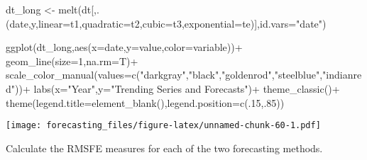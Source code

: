 \documentclass[
  oneside]{book}
\newenvironment{Shaded}{\begin{snugshade}}{\end{snugshade}}
\newcommand{\AttributeTok}[1]{\textcolor[rgb]{0.77,0.63,0.00}{#1}}
\newcommand{\DecValTok}[1]{\textcolor[rgb]{0.00,0.00,0.81}{#1}}
\newcommand{\FunctionTok}[1]{\textcolor[rgb]{0.00,0.00,0.00}{#1}}
\newcommand{\NormalTok}[1]{#1}
\newcommand{\OtherTok}[1]{\textcolor[rgb]{0.56,0.35,0.01}{#1}}
\newcommand{\SpecialCharTok}[1]{\textcolor[rgb]{0.00,0.00,0.00}{#1}}
\newcommand{\StringTok}[1]{\textcolor[rgb]{0.31,0.60,0.02}{#1}}
\begin{document}
\begin{Shaded}
\begin{Highlighting}[]
\NormalTok{dt\_long }\OtherTok{\textless{}{-}} \FunctionTok{melt}\NormalTok{(dt[,.(date,y,}\AttributeTok{linear=}\NormalTok{t1,}\AttributeTok{quadratic=}\NormalTok{t2,}\AttributeTok{cubic=}\NormalTok{t3,}\AttributeTok{exponential=}\NormalTok{te)],}\AttributeTok{id.vars=}\StringTok{"date"}\NormalTok{)}

\FunctionTok{ggplot}\NormalTok{(dt\_long,}\FunctionTok{aes}\NormalTok{(}\AttributeTok{x=}\NormalTok{date,}\AttributeTok{y=}\NormalTok{value,}\AttributeTok{color=}\NormalTok{variable))}\SpecialCharTok{+}
  \FunctionTok{geom\_line}\NormalTok{(}\AttributeTok{size=}\DecValTok{1}\NormalTok{,}\AttributeTok{na.rm=}\NormalTok{T)}\SpecialCharTok{+}
  \FunctionTok{scale\_color\_manual}\NormalTok{(}\AttributeTok{values=}\FunctionTok{c}\NormalTok{(}\StringTok{"darkgray"}\NormalTok{,}\StringTok{"black"}\NormalTok{,}\StringTok{"goldenrod"}\NormalTok{,}\StringTok{"steelblue"}\NormalTok{,}\StringTok{"indianred"}\NormalTok{))}\SpecialCharTok{+}
  \FunctionTok{labs}\NormalTok{(}\AttributeTok{x=}\StringTok{"Year"}\NormalTok{,}\AttributeTok{y=}\StringTok{"Trending Series and Forecasts"}\NormalTok{)}\SpecialCharTok{+}
  \FunctionTok{theme\_classic}\NormalTok{()}\SpecialCharTok{+}
  \FunctionTok{theme}\NormalTok{(}\AttributeTok{legend.title=}\FunctionTok{element\_blank}\NormalTok{(),}\AttributeTok{legend.position=}\FunctionTok{c}\NormalTok{(.}\DecValTok{15}\NormalTok{,.}\DecValTok{85}\NormalTok{))}
\end{Highlighting}
\end{Shaded}

\texttt{[image: forecasting\_files/figure-latex/unnamed-chunk-60-1.pdf]}

Calculate the RMSFE measures for each of the two forecasting methods.
\end{document}
